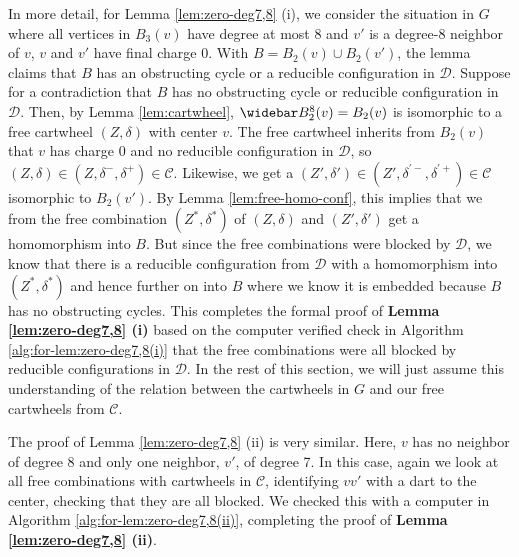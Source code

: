 \documentclass[10pt,a4paper]{article}
\renewcommand{\bar}{\widebar}
\def\cD{{\mathcal D}}
\def\cC{{\mathcal C}}
\begin{document}
In more detail, for Lemma \ref{lem:zero-deg7,8} (i), we consider the situation in $G$ where all vertices
in $B_3(v)$ have degree at most 8 and $v'$ is a degree-8 neighbor of $v$,
$v$ and $v'$ have final charge $0$. With
$B=B_2(v)\cup B_2(v')$, the lemma claims that $B$ has an obstructing cycle or a reducible configuration in $\cD$.
Suppose for a contradiction that $B$ has no obstructing cycle or reducible configuration in $\cD$.
Then, by Lemma \ref{lem:cartwheel}, $\bar B_2^8(v)=B_2(v)$ is isomorphic to a free cartwheel $(Z,\delta)$ with center $v$. The free cartwheel inherits from 
$B_2(v)$ that $v$ has charge $0$ and no reducible configuration in $\cD$, so $(Z,\delta)\in (Z,\delta^-,\delta^+)\in \cC$. Likewise, we get
a $(Z',\delta')\in
(Z',\delta^{\prime -},\delta^{\prime+})\in\cC$ isomorphic to $B_2(v')$.
By Lemma \ref{lem:free-homo-conf}, this implies that we from the free combination $(Z^*,\delta^*)$ of $(Z,\delta)$ and $(Z',\delta')$ get a homomorphism into $B$. But since the free combinations were blocked by $\cD$, we know that there is a reducible configuration from $\cD$ with a homomorphism into $(Z^*,\delta^*)$ and hence further on into $B$ where we know it is embedded because $B$ has no obstructing cycles. This completes the formal
proof of 
{\bf Lemma \ref{lem:zero-deg7,8} (i)} based on the computer verified check in Algorithm \ref{alg:for-lem:zero-deg7,8(i)} that the free combinations were all blocked by reducible configurations in $\cD$.
In the rest of this section, we will just assume this understanding of the relation between the cartwheels in $G$ and our free cartwheels from $\cC$.





The proof of Lemma \ref{lem:zero-deg7,8} (ii) is very similar. Here, $v$ has no neighbor of degree 8 and only one neighbor, $v'$, of degree 7. In this case, again we look at all free combinations with cartwheels in $\cC$, identifying $vv'$ with a dart to the center, checking that they are all blocked. We checked this with a computer in Algorithm \ref{alg:for-lem:zero-deg7,8(ii)}, completing the proof of {\bf Lemma \ref{lem:zero-deg7,8} (ii)}.
\end{document}
